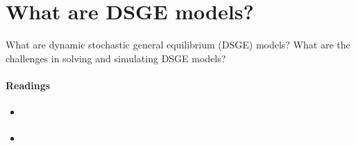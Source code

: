 \section[What are DSGE Models]{What are DSGE models?\label{ex:DSGEModels}}
What are dynamic stochastic general equilibrium (DSGE) models?
What are the challenges in solving and simulating DSGE models?
\paragraph{Readings}
\begin{itemize}
	\item \textcite[Ch. 1]{Fernandez-Villaverde.Rubio-Ramirez.Schorfheide_2016_SolutionEstimationMethods}
	\item \textcite[Ch. 1]{Herbst.Schorfheide_2016_BayesianEstimationDSGE}	
\end{itemize}

